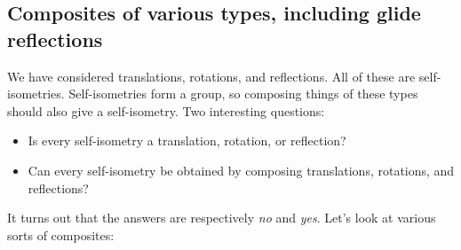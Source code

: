 \documentclass[10pt]{amsart}
\begin{document}
\subsection{Composites of various types, including glide reflections}

We have considered translations, rotations, and reflections. All of
these are self-isometries. Self-isometries form a group, so composing
things of these types should also give a self-isometry. Two
interesting questions:

\begin{itemize}
\item Is every self-isometry a translation, rotation, or reflection?
\item Can every self-isometry be obtained by composing translations,
  rotations, and reflections?
\end{itemize}

It turns out that the answers are respectively {\em no} and {\em
  yes}. Let's look at various sorts of composites:
\end{document}
